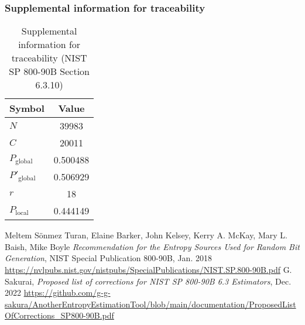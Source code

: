 \documentclass[a3paper,xelatex,english]{bxjsarticle}
\begin{document}
\subsubsection{Supplemental information for traceability}
\renewcommand{\arraystretch}{1.8}
\begin{table}[h]
\caption{Supplemental information for traceability (NIST SP 800-90B Section 6.3.10)}
\begin{center}
\begin{tabular}{|l|c|}
\hline 
\rowcolor{anotherlightblue} %
Symbol				& Value \\ \hline 
$N$				& 39983\\ \hline 
$C$				& 20011\\ \hline 
$P_{\textrm{global}}$				& 0.500488\\ \hline 
$P'_{\textrm{global}}$			& 0.506929\\ \hline 
$r$				& 18\\ \hline 
$P_{\textrm{local}}$ 			& 0.444149\\ \hline
\end{tabular}
\end{center}
\end{table}
\renewcommand{\arraystretch}{1.4}
\begin{thebibliography}{99}
Meltem S\"{o}nmez Turan,
Elaine Barker,
John Kelsey,
Kerry A. McKay,
Mary L. Baish,
Mike Boyle
\textit{Recommendation for the Entropy Sources Used for Random Bit Generation},
NIST Special Publication 800-90B, Jan. 2018 
\url{https://nvlpubs.nist.gov/nistpubs/SpecialPublications/NIST.SP.800-90B.pdf}
G. Sakurai, \textit{Proposed list of corrections for NIST SP 800-90B 6.3 Estimators}, Dec. 2022 
\url{https://github.com/g-g-sakura/AnotherEntropyEstimationTool/blob/main/documentation/ProposedListOfCorrections_SP800-90B.pdf}
\end{thebibliography}
\end{document}

